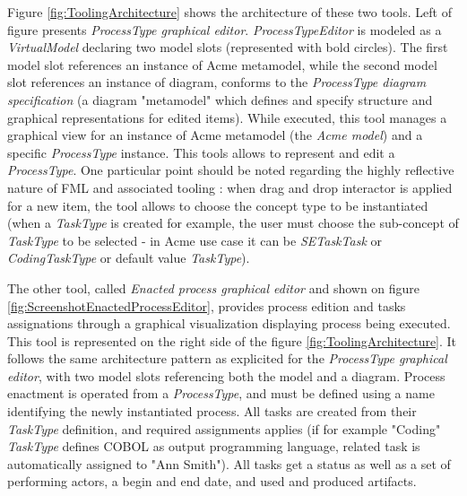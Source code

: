 Figure \ref{fig:ToolingArchitecture} shows the architecture of these two tools. Left of figure presents \textit{ProcessType graphical editor}. \textit{ProcessTypeEditor} is modeled as a \textit{VirtualModel} declaring two model slots (represented with bold circles). The first model slot references an instance of Acme metamodel, while the second model slot references an instance of diagram, conforms to the \textit{ProcessType diagram specification} (a diagram "metamodel" which defines and specify structure and graphical representations for edited items). While executed, this tool manages a graphical view for an instance of Acme metamodel (the \textit{Acme model}) and a specific \textit{ProcessType} instance. This tools allows to represent and edit a \textit{ProcessType}. One particular point should be noted regarding the highly reflective nature of FML and associated tooling : when drag and drop interactor is applied for a new item, the tool allows to choose the concept type to be instantiated (when a \textit{TaskType} is created for example, the user must choose the sub-concept of \textit{TaskType} to be selected - in Acme use case it can be \textit{SETaskTask} or \textit{CodingTaskType} or default value \textit{TaskType}). 

The other tool, called \textit{Enacted process graphical editor} and shown on figure \ref{fig:ScreenshotEnactedProcessEditor}, provides process edition and tasks assignations through a graphical visualization displaying process being executed. This tool is represented on the right side of the figure \ref{fig:ToolingArchitecture}. It follows the same architecture pattern as explicited for the \textit{ProcessType graphical editor}, with two model slots referencing both the model and a diagram. Process enactment is operated from a \textit{ProcessType}, and must be defined using a name identifying the newly instantiated process. All tasks are created from their \textit{TaskType} definition, and required assignments applies (if for example "Coding" \textit{TaskType} defines COBOL as output programming language, related task is automatically assigned to "Ann Smith"). All tasks get a status as well as a set of performing actors, a begin and end date, and used and produced artifacts. 

